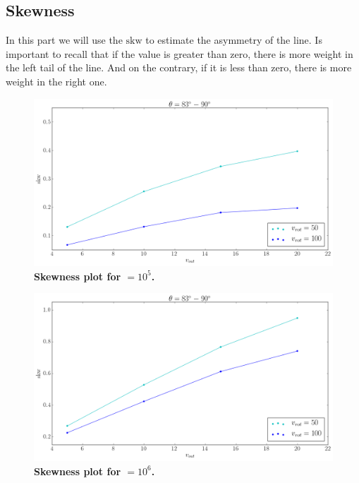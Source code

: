 \subsection{Skewness}
In this part we will use the $\mathrm{skw}$ to estimate the asymmetry of the \lya line. Is important to recall that if the value is greater than zero, there is more weight in the left tail of the line. And on the contrary, if it is less than zero, there is more weight in the right one.\\

\begin{figure}[h!]
	\begin{center}
		\includegraphics[width=1\textwidth]{./figures/chapter3/tau10E5_skw_phi83-90}
	\end{center}
	\caption{\textbf{Skewness plot for \tauh$=10^5$.} 
		\label{fig:tau10E5_skw_phi83-90}}
\end{figure}

\begin{figure}[h!]
	\begin{center}
		\includegraphics[width=1\textwidth]{./figures/chapter3/tau10E6_skw_phi83-90}
	\end{center}
	\caption{\textbf{Skewness plot for \tauh$=10^6$.} 
		\label{fig:tau10E6_skw_phi83-90}}
\end{figure}

